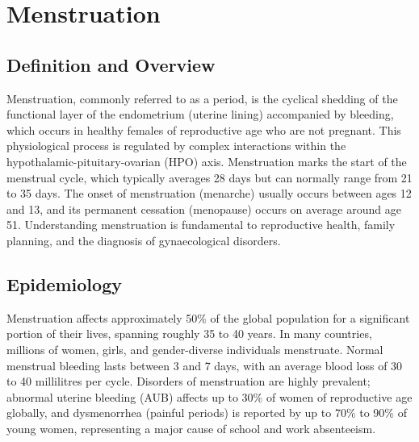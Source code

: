 \chapter{Menstruation}

\section*{Definition and Overview}
Menstruation, commonly referred to as a period, is the cyclical shedding of the functional layer of the endometrium (uterine lining) accompanied by bleeding, which occurs in healthy females of reproductive age who are not pregnant. This physiological process is regulated by complex interactions within the hypothalamic-pituitary-ovarian (HPO) axis. Menstruation marks the start of the menstrual cycle, which typically averages 28 days but can normally range from 21 to 35 days. The onset of menstruation (menarche) usually occurs between ages 12 and 13, and its permanent cessation (menopause) occurs on average around age 51. Understanding menstruation is fundamental to reproductive health, family planning, and the diagnosis of gynaecological disorders.

\section*{Epidemiology}
Menstruation affects approximately 50\% of the global population for a significant portion of their lives, spanning roughly 35 to 40 years. In many countries, millions of women, girls, and gender-diverse individuals menstruate. Normal menstrual bleeding lasts between 3 and 7 days, with an average blood loss of 30 to 40 millilitres per cycle. Disorders of menstruation are highly prevalent; abnormal uterine bleeding (AUB) affects up to 30\% of women of reproductive age globally, and dysmenorrhea (painful periods) is reported by up to 70\% to 90\% of young women, representing a major cause of school and work absenteeism.


